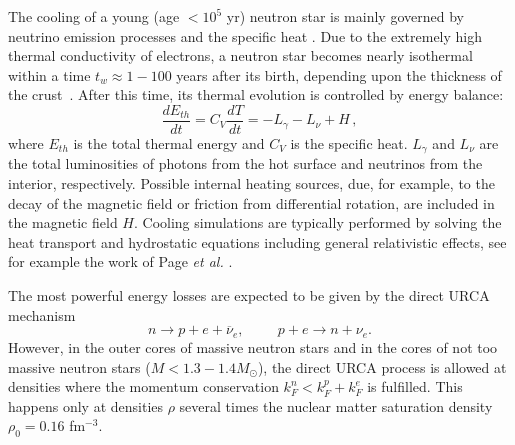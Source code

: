 \documentclass[preprint,rmp,aps,floatfix]{revtex4}
\begin{document}
The cooling of a young (age $<10^5$ yr) neutron star is mainly
governed by neutrino emission processes and the specific heat
\cite{page2000,schaab1996a,schaab1996b}.  
Due to the extremely high thermal conductivity of
electrons, a neutron star becomes nearly isothermal within a time
$t_w\approx1-100$ years after its birth, depending upon the thickness
of the crust~\cite{pr95}.  After this time, its thermal evolution is
controlled by energy balance: 
\begin{equation}
 \frac{dE_{th}}{dt} = C_V \frac{dT}{dt} = -L_{\gamma} -L_{\nu} + H \,,
\label{equ:balance}
\end{equation} 
where $E_{th}$ is the total thermal energy and $C_V$ is the
specific heat.  $L_{\gamma}$ and $L_{\nu}$ are the total luminosities
of photons from the hot surface and neutrinos from the interior,
respectively.  Possible internal heating sources, due, for example, to
the decay of the magnetic field or friction from differential
rotation, are included in the magnetic field $H$.  
Cooling simulations are typically performed
by solving the heat transport and hydrostatic equations including
general relativistic effects, see for example the work of Page 
{\em et al.} \cite{page2000}.  

The most powerful energy losses are expected to be given by the 
direct URCA mechanism
\begin{equation}
    n\rightarrow p +e +\overline{\nu}_e, \hspace{1cm} p+e \rightarrow
    n+\nu_e .
    \label{eq:directU}
\end{equation}
However, in the outer cores of massive neutron stars and in the
cores of not too massive neutron stars ($M < 1.3-1.4 M_{\odot}$), the direct
URCA process is allowed at densities
where the momentum conservation $k_F^n < k_F^p + k_F^e$ is
fulfilled. This happens
only at densities $\rho$ several times
the nuclear matter saturation density $\rho_0 =0.16$ fm$^{-3}$.
\end{document}
